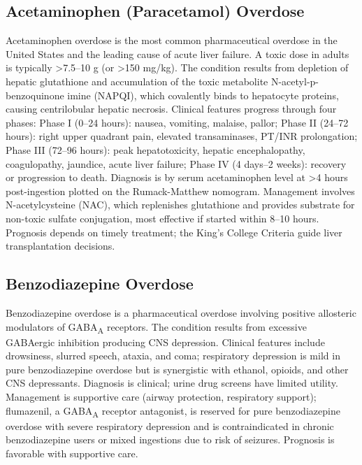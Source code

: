 \subsection{Acetaminophen (Paracetamol) Overdose}
\label{sec:Acetaminophen Overdose}
Acetaminophen overdose is the most common pharmaceutical overdose in the United States and the leading cause of acute liver failure. A toxic dose in adults is typically >7.5--10 g (or >150 mg/kg). The condition results from depletion of hepatic glutathione and accumulation of the toxic metabolite N-acetyl-p-benzoquinone imine (NAPQI), which covalently binds to hepatocyte proteins, causing centrilobular hepatic necrosis. Clinical features progress through four phases: Phase I (0--24 hours): nausea, vomiting, malaise, pallor; Phase II (24--72 hours): right upper quadrant pain, elevated transaminases, PT/INR prolongation; Phase III (72--96 hours): peak hepatotoxicity, hepatic encephalopathy, coagulopathy, jaundice, acute liver failure; Phase IV (4 days--2 weeks): recovery or progression to death. Diagnosis is by serum acetaminophen level at >4 hours post-ingestion plotted on the Rumack-Matthew nomogram. Management involves N-acetylcysteine (NAC), which replenishes glutathione and provides substrate for non-toxic sulfate conjugation, most effective if started within 8--10 hours. Prognosis depends on timely treatment; the King's College Criteria guide liver transplantation decisions.

\subsection{Benzodiazepine Overdose}
\label{sec:Benzodiazepine Overdose}
Benzodiazepine overdose is a pharmaceutical overdose involving positive allosteric modulators of GABA\textsubscript{A} receptors. The condition results from excessive GABAergic inhibition producing CNS depression. Clinical features include drowsiness, slurred speech, ataxia, and coma; respiratory depression is mild in pure benzodiazepine overdose but is synergistic with ethanol, opioids, and other CNS depressants. Diagnosis is clinical; urine drug screens have limited utility. Management is supportive care (airway protection, respiratory support); flumazenil, a GABA\textsubscript{A} receptor antagonist, is reserved for pure benzodiazepine overdose with severe respiratory depression and is contraindicated in chronic benzodiazepine users or mixed ingestions due to risk of seizures. Prognosis is favorable with supportive care.

